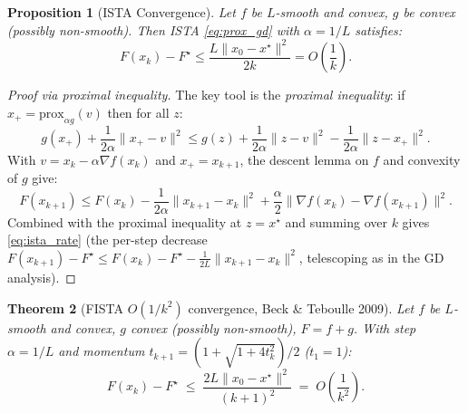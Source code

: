 \documentclass[11pt,a4paper]{article}
\newtheorem{theorem}{Theorem}[section]
\newtheorem{proposition}[theorem]{Proposition}
\theoremstyle{definition}
\begin{document}
\begin{proposition}[ISTA Convergence]
\label{prop:ista}
Let $f$ be $L$-smooth and convex, $g$ be convex (possibly non-smooth). Then ISTA \eqref{eq:prox_gd} with $\alpha = 1/L$ satisfies:
\begin{equation}
F(x_k) - F^{\star} \leq \frac{L\|x_0 - x^{\star}\|^2}{2k} = O\!\left(\frac{1}{k}\right).
\label{eq:ista_rate}
\end{equation}
\end{proposition}

\begin{proof}[Proof via proximal inequality]
The key tool is the \emph{proximal inequality}: if $x_+ = \text{prox}_{\alpha g}(v)$ then for all $z$:
\begin{equation}
g(x_+) + \frac{1}{2\alpha}\|x_+ - v\|^2 \leq g(z) + \frac{1}{2\alpha}\|z - v\|^2 - \frac{1}{2\alpha}\|z - x_+\|^2.
\label{eq:prox_ineq}
\end{equation}
With $v = x_k - \alpha \nabla f(x_k)$ and $x_+ = x_{k+1}$, the descent lemma on $f$ and convexity of $g$ give:
\begin{equation}
F(x_{k+1}) \leq F(x_k) - \frac{1}{2\alpha}\|x_{k+1} - x_k\|^2 + \frac{\alpha}{2}\|\nabla f(x_k) - \nabla f(x_{k+1})\|^2.
\end{equation}
Combined with the proximal inequality at $z = x^{\star}$ and summing over $k$ gives \eqref{eq:ista_rate} (the per-step decrease $F(x_{k+1}) - F^{\star} \leq F(x_k) - F^{\star} - \frac{1}{2L}\|x_{k+1} - x_k\|^2$, telescoping as in the GD analysis).
\end{proof}

\begin{theorem}[FISTA $O(1/k^2)$ convergence, Beck \& Teboulle 2009]
\label{thm:fista}
Let $f$ be $L$-smooth and convex, $g$ convex (possibly non-smooth), $F = f + g$. With step $\alpha = 1/L$ and momentum $t_{k+1} = (1 + \sqrt{1 + 4t_k^2})/2$ ($t_1 = 1$):
\begin{equation}
F(x_k) - F^{\star} \;\leq\; \frac{2L\|x_0 - x^{\star}\|^2}{(k+1)^2} \;=\; O\!\left(\frac{1}{k^2}\right).
\label{eq:fista_rate}
\end{equation}
\end{theorem}
\end{document}
